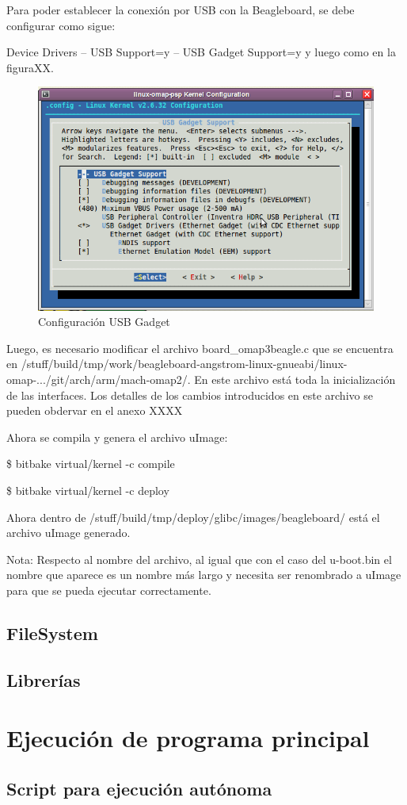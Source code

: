 Para poder establecer la conexión por USB con la Beagleboard, se debe configurar como sigue: 

Device Drivers – USB Support=y – USB Gadget Support=y y luego como en la figuraXX.

\begin{figure}[H]
\centering
  \begin{center}
  \includegraphics[scale=.4]{Imagenes/usb_chica.png} 
  \end{center}
  \caption{Configuración USB Gadget}\label{Fig:HW} 
\end{figure}

Luego, es necesario modificar el archivo board\_omap3beagle.c que se encuentra en /stuff/build/tmp/work/beagleboard-angstrom-linux-gnueabi/linux-omap-.../git/arch/arm/mach-omap2/. En este archivo está toda la inicialización de las interfaces. Los detalles de los cambios introducidos en este archivo se pueden obdervar en el anexo XXXX

Ahora se compila y genera el archivo uImage:

\$ bitbake virtual/kernel -c compile 

\$ bitbake virtual/kernel -c deploy 

Ahora dentro de /stuff/build/tmp/deploy/glibc/images/beagleboard/ está el archivo uImage generado.

Nota: Respecto al nombre del archivo, al igual que con el caso del u-boot.bin el nombre que aparece es un nombre más largo y necesita ser renombrado a uImage para que se pueda ejecutar correctamente.


\subsection{FileSystem}
\subsection{Librerías}

\section{Ejecución de programa principal}
\subsection{Script para ejecución autónoma}
